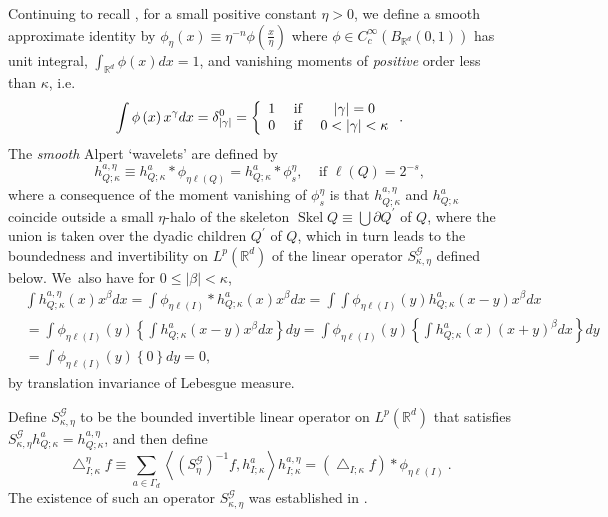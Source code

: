 \documentclass{amsart}%
\theoremstyle{plain}
\numberwithin{equation}{section}
\begin{document}
Continuing to recall \cite{Saw7}, for a small positive constant $\eta>0$, we
define a smooth approximate identity by $\phi_{\eta}\left(  x\right)
\equiv\eta^{-n}\phi\left(  \frac{x}{\eta}\right)  $ where $\phi\in
C_{c}^{\infty}\left(  B_{\mathbb{R}^{d}}\left(  0,1\right)  \right)  $ has
unit integral, $\int_{\mathbb{R}^{d}}\phi\left(  x\right)  dx=1$, and
vanishing moments of \emph{positive} order less than $\kappa$, i.e.
\begin{equation}
\int\phi\left(  x\right)  x^{\gamma}dx=\delta_{\left\vert \gamma\right\vert
}^{0}=\left\{
\begin{array}
[c]{ccc}%
1 & \text{ if } & \left\vert \gamma\right\vert =0\\
0 & \text{ if } & 0<\left\vert \gamma\right\vert <\kappa
\end{array}
\right.  .\label{van pos}%
\end{equation}
The \emph{smooth} Alpert `wavelets' are defined by%
\[
h_{Q;\kappa}^{a,\eta}\equiv h_{Q;\kappa}^{a}\ast\phi_{\eta\ell\left(
Q\right)  }=h_{Q;\kappa}^{a}\ast\phi_{s}^{\eta},\ \ \ \ \ \text{if }%
\ell\left(  Q\right)  =2^{-s},
\]
where a consequence of the moment vanishing of $\phi_{s}^{\eta}$ is that
$h_{Q;\kappa}^{a,\eta}$ and $h_{Q;\kappa}^{a}$ coincide outside a small $\eta
$-halo of the skeleton $\operatorname*{Skel}Q\equiv\bigcup\partial Q^{\prime}$
of $Q$, where the union is taken over the dyadic children $Q^{\prime}$ of $Q$,
which in turn leads to the boundedness and invertibility on $L^{p}\left(
\mathbb{R}^{d}\right)  $ of the linear operator $S_{\kappa,\eta}^{\mathcal{G}%
}$ defined below. We\ also have for $0\leq\left\vert \beta\right\vert <\kappa
$,%
\begin{align*}
&  \int h_{Q;\kappa}^{a,\eta}\left(  x\right)  x^{\beta}dx=\int\phi_{\eta
\ell\left(  I\right)  }\ast h_{Q;\kappa}^{a}\left(  x\right)  x^{\beta}%
dx=\int\int\phi_{\eta\ell\left(  I\right)  }\left(  y\right)  h_{Q;\kappa}%
^{a}\left(  x-y\right)  x^{\beta}dx\\
&  =\int\phi_{\eta\ell\left(  I\right)  }\left(  y\right)  \left\{  \int
h_{Q;\kappa}^{a}\left(  x-y\right)  x^{\beta}dx\right\}  dy=\int\phi_{\eta
\ell\left(  I\right)  }\left(  y\right)  \left\{  \int h_{Q;\kappa}^{a}\left(
x\right)  \left(  x+y\right)  ^{\beta}dx\right\}  dy\\
&  =\int\phi_{\eta\ell\left(  I\right)  }\left(  y\right)  \left\{  0\right\}
dy=0,
\end{align*}
by translation invariance of Lebesgue measure.

Define $S_{\kappa,\eta}^{\mathcal{G}}$ to be the bounded invertible linear
operator on $L^{p}\left(  \mathbb{R}^{d}\right)  $ that satisfies
$S_{\kappa,\eta}^{\mathcal{G}}h_{Q;\kappa}^{a}=h_{Q;\kappa}^{a,\eta}$, and
then define%
\[
\bigtriangleup_{I;\kappa}^{\eta}f\equiv\sum_{a\in\Gamma_{d}}\left\langle
\left(  S_{\eta}^{\mathcal{G}}\right)  ^{-1}f,h_{I;\kappa}^{a}\right\rangle
h_{I;\kappa}^{a,\eta}=\left(  \bigtriangleup_{I;\kappa}f\right)  \ast
\phi_{\eta\ell\left(  I\right)  }\ .
\]
The existence of such an operator $S_{\kappa,\eta}^{\mathcal{G}}$ was
established in \cite{Saw7}.
\end{document}
